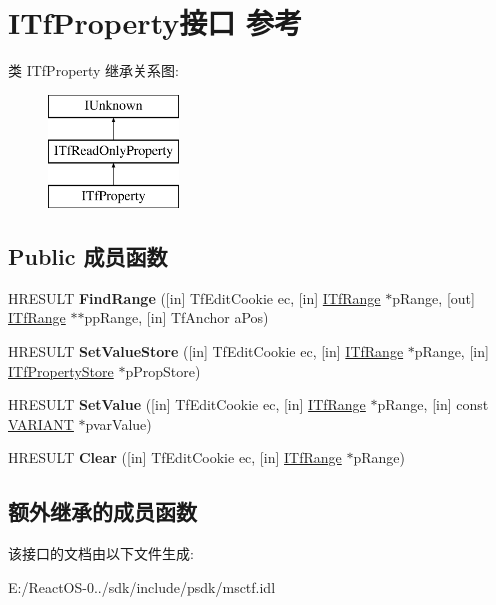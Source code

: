 \hypertarget{interface_i_tf_property}{}\section{I\+Tf\+Property接口 参考}
\label{interface_i_tf_property}
类 I\+Tf\+Property 继承关系图\+:\begin{figure}[H]
\begin{center}
\leavevmode
\includegraphics[height=3.000000cm]{interface_i_tf_property}
\end{center}
\end{figure}
\subsection*{Public 成员函数}
\begin{DoxyCompactItemize}
\item 
\mbox{\label{interface_i_tf_property_a735538cfdd864976ada523e55f7aa688}} 
H\+R\+E\+S\+U\+LT {\bfseries Find\+Range} (\mbox{[}in\mbox{]} Tf\+Edit\+Cookie ec, \mbox{[}in\mbox{]} \hyperlink{interface_i_tf_range}{I\+Tf\+Range} $\ast$p\+Range, \mbox{[}out\mbox{]} \hyperlink{interface_i_tf_range}{I\+Tf\+Range} $\ast$$\ast$pp\+Range, \mbox{[}in\mbox{]} Tf\+Anchor a\+Pos)
\item 
\mbox{\label{interface_i_tf_property_a125ebb2bccba736596fbba31531c1fc0}} 
H\+R\+E\+S\+U\+LT {\bfseries Set\+Value\+Store} (\mbox{[}in\mbox{]} Tf\+Edit\+Cookie ec, \mbox{[}in\mbox{]} \hyperlink{interface_i_tf_range}{I\+Tf\+Range} $\ast$p\+Range, \mbox{[}in\mbox{]} \hyperlink{interface_i_tf_property_store}{I\+Tf\+Property\+Store} $\ast$p\+Prop\+Store)
\item 
\mbox{\label{interface_i_tf_property_aee01913a4fce5ce18b22842ad1a058ec}} 
H\+R\+E\+S\+U\+LT {\bfseries Set\+Value} (\mbox{[}in\mbox{]} Tf\+Edit\+Cookie ec, \mbox{[}in\mbox{]} \hyperlink{interface_i_tf_range}{I\+Tf\+Range} $\ast$p\+Range, \mbox{[}in\mbox{]} const \hyperlink{structtag_v_a_r_i_a_n_t}{V\+A\+R\+I\+A\+NT} $\ast$pvar\+Value)
\item 
\mbox{\label{interface_i_tf_property_a68a456e36d50f545d41c405584f44d31}} 
H\+R\+E\+S\+U\+LT {\bfseries Clear} (\mbox{[}in\mbox{]} Tf\+Edit\+Cookie ec, \mbox{[}in\mbox{]} \hyperlink{interface_i_tf_range}{I\+Tf\+Range} $\ast$p\+Range)
\end{DoxyCompactItemize}
\subsection*{额外继承的成员函数}


该接口的文档由以下文件生成\+:\begin{DoxyCompactItemize}
\item 
E\+:/\+React\+O\+S-\/0../sdk/include/psdk/msctf.\+idl\end{DoxyCompactItemize}
